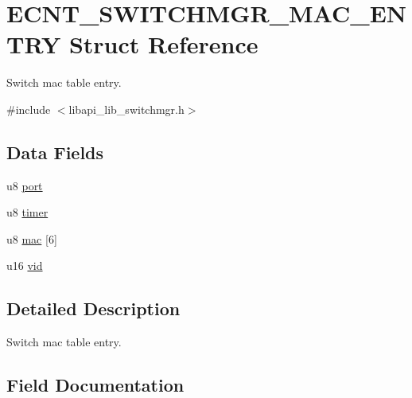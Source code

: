 \hypertarget{structECNT__SWITCHMGR__MAC__ENTRY}{}\section{E\+C\+N\+T\+\_\+\+S\+W\+I\+T\+C\+H\+M\+G\+R\+\_\+\+M\+A\+C\+\_\+\+E\+N\+T\+RY Struct Reference}
\label{structECNT__SWITCHMGR__MAC__ENTRY}


Switch mac table entry.  




{\ttfamily \#include $<$libapi\+\_\+lib\+\_\+switchmgr.\+h$>$}

\subsection*{Data Fields}
\begin{DoxyCompactItemize}
\item 
u8 \hyperlink{structECNT__SWITCHMGR__MAC__ENTRY_a9d8d41441031255aaca615a2757e6ba8}{port}
\item 
u8 \hyperlink{structECNT__SWITCHMGR__MAC__ENTRY_a370def6e95c71fc03f5610f8750a4c61}{timer}
\item 
u8 \hyperlink{structECNT__SWITCHMGR__MAC__ENTRY_af61f92c0485fa0b079e70f9a727e3cd1}{mac} \mbox{[}6\mbox{]}
\item 
u16 \hyperlink{structECNT__SWITCHMGR__MAC__ENTRY_a707a93e2876a8d1a8d894df4cfaf2f2d}{vid}
\end{DoxyCompactItemize}


\subsection{Detailed Description}
Switch mac table entry. 

\subsection{Field Documentation}
\mbox{\label{structECNT__SWITCHMGR__MAC__ENTRY_af61f92c0485fa0b079e70f9a727e3cd1}} 
